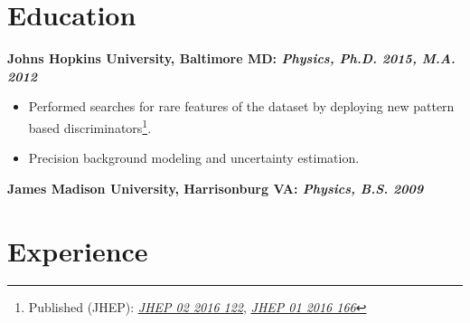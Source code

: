 \documentclass[12pt]{article}
\begin{document}
\newenvironment{newitemize2}{\renewcommand\labelitemi{--}
\begin{itemize}[
  align=left,
  leftmargin=2em,
  itemindent=0pt,
  labelsep=0pt,
  labelwidth=1em
]}
{\end{itemize}}

\section*{Education}


\textbf{\hspace*{0.2cm}Johns Hopkins University, Baltimore MD:  \textit{Physics, Ph.D. 2015, M.A. 2012}}
\begin{newitemize2}
\item  Performed searches for rare features of the dataset by deploying new pattern based discriminators\footnote{Published (JHEP): \href{http://dx.doi.org/10.1007/JHEP02(2016)122}{\textit{\underline{JHEP 02 2016 122}}}, \href{http://dx.doi.org/10.1007/JHEP01(2016)166}{\textit{\underline{JHEP 01 2016 166}}}}.
\item  Precision background modeling and uncertainty estimation.\\
\end{newitemize2}
\textbf{\hspace*{0.2cm}James Madison University, Harrisonburg VA:  \textit{Physics, B.S. 2009}}


\section*{Experience}
\end{document}
